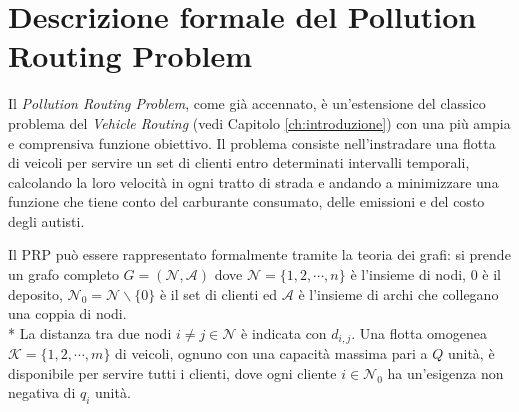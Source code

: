 \chapter{Descrizione formale del Pollution Routing Problem}\label{ch:cap_2}

Il \emph{Pollution Routing Problem}, come già accennato, è un’estensione del classico problema del \emph{Vehicle Routing} (vedi Capitolo \ref{ch:introduzione}) con una più ampia e comprensiva funzione obiettivo. Il problema consiste nell’instradare una flotta di veicoli per servire un set di clienti entro determinati intervalli temporali, calcolando la loro velocità in ogni tratto di strada e andando a minimizzare una funzione che tiene conto del carburante consumato, delle emissioni e del costo degli autisti. 

Il PRP può essere rappresentato formalmente tramite la teoria dei grafi: si prende un grafo completo $G = (\mathcal{N},\mathcal{A})$ dove $\mathcal{N} = \{1, 2, \cdots, n\}$ è l'insieme di nodi, $0$ è il deposito, $\mathcal{N}_0 = \mathcal{N} \backslash \{0\}$ è il set di clienti ed $\mathcal{A}$ è l'insieme di archi che collegano una coppia di nodi. \\*
La distanza tra due nodi $i \neq j \in \mathcal{N}$  è indicata con $d_{i,j}$. Una flotta omogenea $\mathcal{K} = \{1, 2, \cdots, m\}$ di veicoli, ognuno con una capacità massima pari a $Q$ unità, è disponibile per servire tutti i clienti, dove ogni cliente $i \in \mathcal{N}_0$ ha un’esigenza non negativa di $q_{i}$ unità.